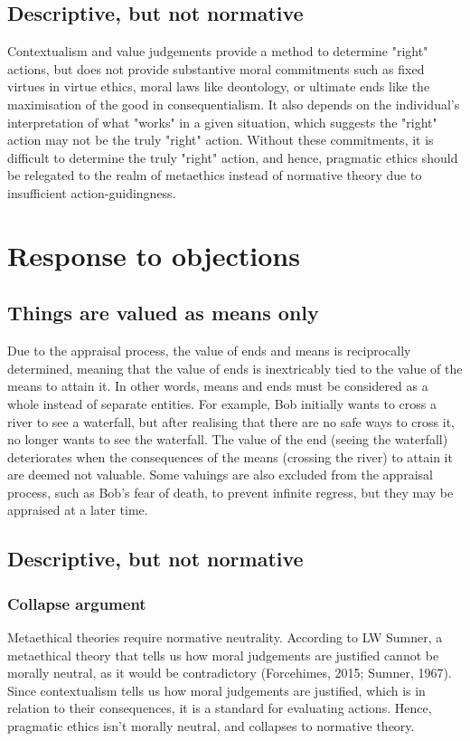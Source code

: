 \documentclass[11pt]{article}
\makeatletter
\newcommand{\cslcitation}[2]
 {\protect\hyper@linkstart{cite}{citeproc_bib_item_#1}#2\hyper@linkend}
\makeatother
\begin{document}
\subsection{Descriptive, but not normative}
\label{sec:org92abc29}
Contextualism and value judgements provide a method to determine
"right" actions, but does not provide substantive moral commitments
such as fixed virtues in virtue ethics, moral laws like deontology,
or ultimate ends like the maximisation of the good in consequentialism.
It also depends on the individual's interpretation of what "works"
in a given situation, which suggests the "right" action
may not be the truly "right" action.
Without these commitments, it is difficult
to determine the truly "right" action,
and hence, pragmatic ethics should be relegated
to the realm of metaethics instead of normative theory
due to insufficient action-guidingness.
\section{Response to objections}
\label{sec:org0e5f094}

\subsection{Things are valued as means only}
\label{sec:org6c5e7b8}
Due to the appraisal process,
the value of ends and means is reciprocally determined,
meaning that the value of ends is inextricably tied to
the value of the means to attain it.
In other words, means and ends must be considered as a whole
instead of separate entities.
For example, Bob initially wants to cross a river to see a waterfall,
but after realising that there are no safe ways to cross it,
no longer wants to see the waterfall.
The value of the end (seeing the waterfall) deteriorates
when the consequences of the means (crossing the river)
to attain it are deemed not valuable.
Some valuings are also excluded from the appraisal process,
such as Bob's fear of death, to prevent infinite regress,
but they may be appraised at a later time.
\subsection{Descriptive, but not normative}
\label{sec:org1f3fb8b}

\subsubsection{Collapse argument}
\label{sec:org90ca02a}
Metaethical theories require normative neutrality.
According to LW Sumner,
a metaethical theory that tells us how
moral judgements are justified cannot be morally neutral,
as it would be contradictory
(\cslcitation{2}{Forcehimes, 2015}; \cslcitation{3}{Sumner, 1967}).
Since contextualism tells us how moral judgements are justified,
which is in relation to their consequences,
it is a standard for evaluating actions.
Hence, pragmatic ethics isn't morally neutral,
and collapses to normative theory.
\end{document}
